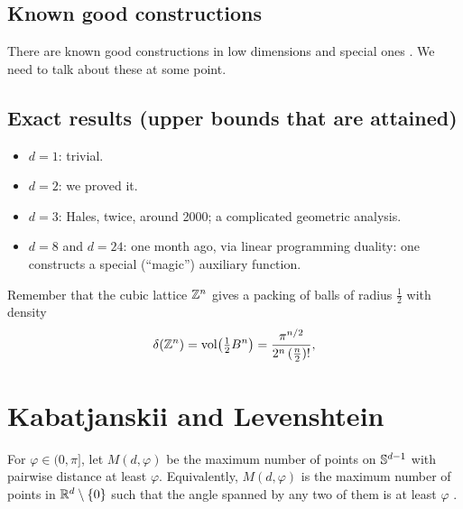 \subsection*{Known good constructions}
There are known good constructions in low dimensions and special ones .
We need to talk about these at some point.

\subsection*{Exact results (upper bounds that are attained)}
\begin{itemize}
\item $d=1$: trivial.
\item $d=2$: we proved it. 
\item $d=3$: Hales, twice, around 2000; a complicated geometric analysis. 
\item $d=8$ and $d=24$: one month ago, via linear programming duality: one constructs a special (``magic'') auxiliary function.
\end{itemize}

\begin{remark}
Remember that the cubic lattice $\mathbb{Z}^n$ gives a packing of balls of radius $\frac12$ with density
\[
  \delta(\mathbb{Z}^n)=\operatorname{vol}\bigl(\tfrac12B^n\bigr)=\frac{\pi^{n/2}}{2^n\,(\frac n2)!},
\]
\end{remark}

\section{Kabatjanskii and Levenshtein}
\label{L3:sec:KL}

\begin{definition}\label{L3:def:M}
For $\varphi\in(0,\pi]$, let $M(d,\varphi)$ be the maximum number of points on $\mathbb{S}^{d-1}$ with pairwise
 distance at least $\varphi$.
Equivalently, $M(d,\varphi)$ is the maximum number of points in $\mathbb{R}^d\setminus\{0\}$ such that the angle
 spanned by any two of them is at least $\varphi$ .
\end{definition}

